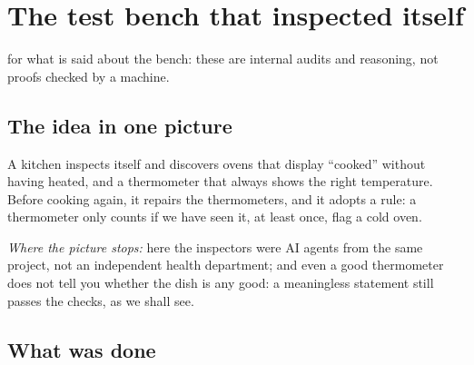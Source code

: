 \chapter[The bench that inspects itself]{The test bench that inspected itself}

\noindent{} for what is said about the bench: these are internal audits and reasoning, not proofs checked
by a machine.

\section*{The idea in one picture}

\begin{analogie}
A kitchen inspects itself and discovers ovens that display ``cooked'' without having heated, and a thermometer that
always shows the right temperature. Before cooking again, it repairs the thermometers, and it adopts a rule: a
thermometer only counts if we have seen it, at least once, flag a cold oven.

\emph{Where the picture stops:} here the inspectors were AI agents from the same project, not an independent
health department; and even a good thermometer does not tell you whether the dish is any good: a meaningless
statement still passes the checks, as we shall see.
\end{analogie}

\section*{What was done}

